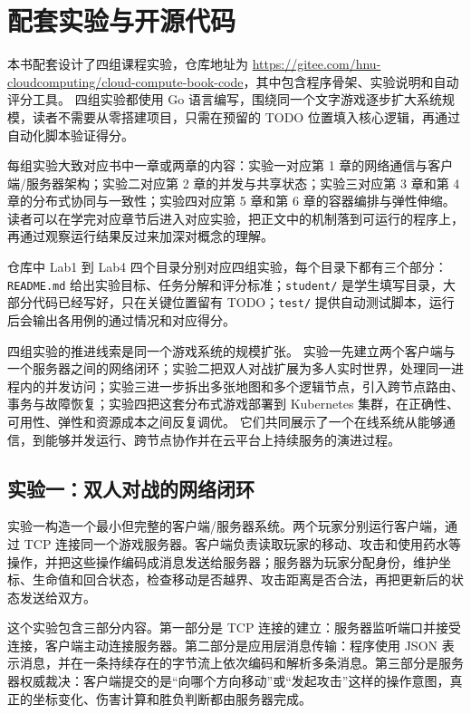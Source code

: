 \section{配套实验与开源代码}
\label{sec:appendix-lab-guide}

本书配套设计了四组课程实验，仓库地址为 \url{https://gitee.com/hnu-cloudcomputing/cloud-compute-book-code}，其中包含程序骨架、实验说明和自动评分工具。
四组实验都使用 Go 语言编写，围绕同一个文字游戏逐步扩大系统规模，读者不需要从零搭建项目，只需在预留的 TODO 位置填入核心逻辑，再通过自动化脚本验证得分。

每组实验大致对应书中一章或两章的内容：实验一对应第 1 章的网络通信与客户端/服务器架构；实验二对应第 2 章的并发与共享状态；实验三对应第 3 章和第 4 章的分布式协同与一致性；实验四对应第 5 章和第 6 章的容器编排与弹性伸缩。
读者可以在学完对应章节后进入对应实验，把正文中的机制落到可运行的程序上，再通过观察运行结果反过来加深对概念的理解。

仓库中 Lab1 到 Lab4 四个目录分别对应四组实验，每个目录下都有三个部分：\texttt{README.md} 给出实验目标、任务分解和评分标准；\texttt{student/} 是学生填写目录，大部分代码已经写好，只在关键位置留有 TODO；\texttt{test/} 提供自动测试脚本，运行后会输出各用例的通过情况和对应得分。

四组实验的推进线索是同一个游戏系统的规模扩张。
实验一先建立两个客户端与一个服务器之间的网络闭环；实验二把双人对战扩展为多人实时世界，处理同一进程内的并发访问；实验三进一步拆出多张地图和多个逻辑节点，引入跨节点路由、事务与故障恢复；实验四把这套分布式游戏部署到 Kubernetes 集群，在正确性、可用性、弹性和资源成本之间反复调优。
它们共同展示了一个在线系统从能够通信，到能够并发运行、跨节点协作并在云平台上持续服务的演进过程。

\subsection{实验一：双人对战的网络闭环}
\label{sec:appendix-lab1}

实验一构造一个最小但完整的客户端/服务器系统。两个玩家分别运行客户端，通过 TCP 连接同一个游戏服务器。客户端负责读取玩家的移动、攻击和使用药水等操作，并把这些操作编码成消息发送给服务器；服务器为玩家分配身份，维护坐标、生命值和回合状态，检查移动是否越界、攻击距离是否合法，再把更新后的状态发送给双方。

这个实验包含三部分内容。第一部分是 TCP 连接的建立：服务器监听端口并接受连接，客户端主动连接服务器。第二部分是应用层消息传输：程序使用 JSON 表示消息，并在一条持续存在的字节流上依次编码和解析多条消息。第三部分是服务器权威裁决：客户端提交的是“向哪个方向移动”或“发起攻击”这样的操作意图，真正的坐标变化、伤害计算和胜负判断都由服务器完成。

